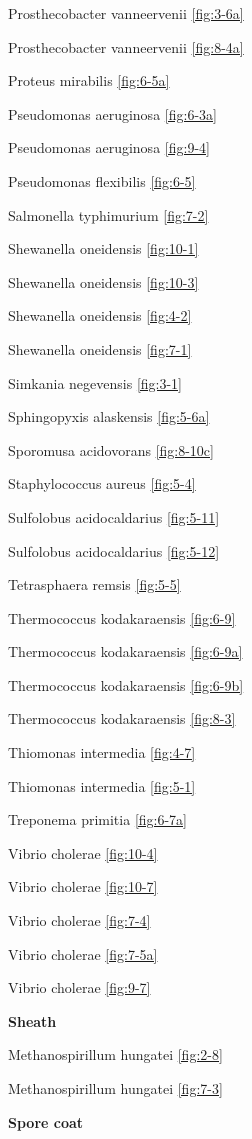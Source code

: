 \documentclass[]{tufte-book}
\begin{document}
Prosthecobacter vanneervenii \ref{fig:3-6a}

Prosthecobacter vanneervenii \ref{fig:8-4a}

Proteus mirabilis \ref{fig:6-5a}

Pseudomonas aeruginosa \ref{fig:6-3a}

Pseudomonas aeruginosa \ref{fig:9-4}

Pseudomonas flexibilis \ref{fig:6-5}

Salmonella typhimurium \ref{fig:7-2}

Shewanella oneidensis \ref{fig:10-1}

Shewanella oneidensis \ref{fig:10-3}

Shewanella oneidensis \ref{fig:4-2}

Shewanella oneidensis \ref{fig:7-1}

Simkania negevensis \ref{fig:3-1}

Sphingopyxis alaskensis \ref{fig:5-6a}

Sporomusa acidovorans \ref{fig:8-10c}

Staphylococcus aureus \ref{fig:5-4}

Sulfolobus acidocaldarius \ref{fig:5-11}

Sulfolobus acidocaldarius \ref{fig:5-12}

Tetrasphaera remsis \ref{fig:5-5}

Thermococcus kodakaraensis \ref{fig:6-9}

Thermococcus kodakaraensis \ref{fig:6-9a}

Thermococcus kodakaraensis \ref{fig:6-9b}

Thermococcus kodakaraensis \ref{fig:8-3}

Thiomonas intermedia \ref{fig:4-7}

Thiomonas intermedia \ref{fig:5-1}

Treponema primitia \ref{fig:6-7a}

Vibrio cholerae \ref{fig:10-4}

Vibrio cholerae \ref{fig:10-7}

Vibrio cholerae \ref{fig:7-4}

Vibrio cholerae \ref{fig:7-5a}

Vibrio cholerae \ref{fig:9-7}

\textbf{Sheath}

Methanospirillum hungatei \ref{fig:2-8}

Methanospirillum hungatei \ref{fig:7-3}

\textbf{Spore coat}
\end{document}
